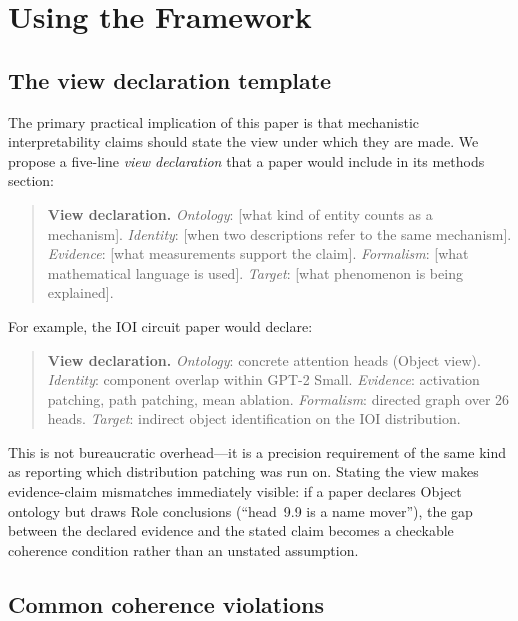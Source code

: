 \documentclass{article}
\begin{document}
\section{Using the Framework}\label{sec:implications}

\subsection{The view declaration template}

The primary practical implication of this paper is that mechanistic
interpretability claims should state the view under which they are made.
We propose a five-line \emph{view declaration} that a paper would
include in its methods section:

\begin{quote}
\small
\textbf{View declaration.}
\emph{Ontology}: [what kind of entity counts as a mechanism].
\emph{Identity}: [when two descriptions refer to the same mechanism].
\emph{Evidence}: [what measurements support the claim].
\emph{Formalism}: [what mathematical language is used].
\emph{Target}: [what phenomenon is being explained].
\end{quote}

For example, the IOI circuit paper \citep{wang2022} would declare:

\begin{quote}
\small
\textbf{View declaration.}
\emph{Ontology}: concrete attention heads (Object view).
\emph{Identity}: component overlap within GPT-2 Small.
\emph{Evidence}: activation patching, path patching, mean ablation.
\emph{Formalism}: directed graph over 26 heads.
\emph{Target}: indirect object identification on the IOI distribution.
\end{quote}

This is not bureaucratic overhead---it is a precision requirement of
the same kind as reporting which distribution patching was run on.
Stating the view makes evidence-claim mismatches immediately visible:
if a paper declares Object ontology but draws Role conclusions
(``head~9.9 is a name mover''), the gap between the declared evidence
and the stated claim becomes a checkable coherence condition rather
than an unstated assumption.

\subsection{Common coherence violations}
\end{document}
